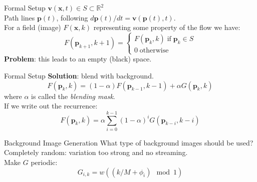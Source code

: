 \documentclass[red]{beamer}
\begin{document}
\begin{frame}{Formal Setup}
  $\boldsymbol{v}(\boldsymbol{x},t) \in S \subset \mathbb{R}^2$\\
  \vspace{10pt}
  Path lines $\boldsymbol{p}(t)$, following $d\boldsymbol{p}(t)/dt = \boldsymbol{v}(\boldsymbol{p}(t),t)$.\\
  \vspace{10pt}
  For a field (image) $F(\boldsymbol{x},k)$ representing some property of the flow we have:
  \begin{equation*}
    F(\boldsymbol{p}_{k+1},k+1) = \begin{cases} F(\boldsymbol{p}_{k},k) \; \text{if} \; \boldsymbol{p}_k \in S \\
      0 \; \text{otherwise}
      \end{cases}
  \end{equation*}
  \textbf{Problem}: this leads to an empty (black) space.
\end{frame}

\begin{frame}{Formal Setup}
  \textbf{Solution}: blend with background.
  \begin{equation*}
    F(\boldsymbol{p}_{k},k) = (1 - \alpha) F(\boldsymbol{p}_{k-1},k-1) + \alpha G(\boldsymbol{p}_k,k)
  \end{equation*}
  where $\alpha$ is called the \emph{blending mask}.\\
  \vspace{5pt}
  If we write out the recurrence:
  \begin{equation*}
    F(\boldsymbol{p}_{k},k) = \alpha \sum^{k-1}_{i=0} (1 - \alpha)^i G(\boldsymbol{p}_{k-i},k-i)    
  \end{equation*}
\end{frame}

\begin{frame}{Background Image Generation}
  What type of background images should be used?\\
  \vspace{10pt}
  Completely random: variation too strong and no streaming.\\
  \vspace{10pt}
  Make $G$ periodic:\\
  \begin{equation*}
    G_{i,k} = w((k/M + \phi_i) \mod 1)
  \end{equation*}
\end{frame}
\end{document}
